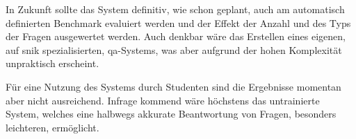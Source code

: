 In Zukunft sollte das System definitiv, wie schon geplant, auch am automatisch definierten Benchmark evaluiert werden und der Effekt der Anzahl und des Typs der Fragen ausgewertet werden.
Auch denkbar wäre das Erstellen eines eigenen, auf \ac{snik} spezialisierten, \ac{qa}-Systems, was aber aufgrund der hohen Komplexität unpraktisch erscheint.

Für eine Nutzung des Systems durch Studenten sind die Ergebnisse momentan aber nicht ausreichend.
Infrage kommend wäre höchstens das untrainierte System, welches eine halbwegs akkurate Beantwortung von Fragen, besonders leichteren, ermöglicht.
